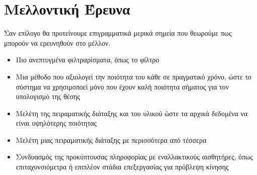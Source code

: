 \section{Μελλοντική Έρευνα}
Σαν επίλογο θα προτείνουμε επιγραμματικά μερικά σημεία που θεωρούμε πως μπορούν να ερευνηθούν
στο μέλλον.
\begin{itemize}
\item Πιο ανεπτυγμένα φιλτραρίσματα, όπως το φίλτρο 
\item Μια μέθοδο που αξιολογεί την ποιότητα του κάθε  σε πραγματικό χρόνο, ώστε το σύστημα
να χρησιμοποεί μόνο  που έχουν καλή ποιότητα σήματος για τον υπολογισμό της θέσης
\item Μελέτη της πειραματικής διάταξης και του υλικού ώστε τα αρχικά δεδομένα να είναι υψηλότερης
ποιότητας
\item Μελέτη μιας πειραματικής διάταξης με περισσότερα από τέσσερα 
\item Συνδυασμός της προκύπτουσας πληροφορίας με εναλλακτικούς αισθητήρες, όπως επιταχυνσιόμετρα ή επιπλέον στάδια
επεξεργασίας για πρόβλεψη κίνησης
\end{itemize}

